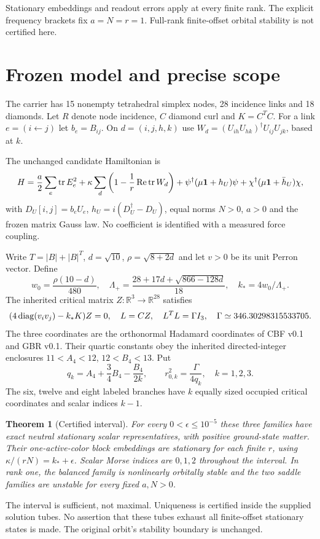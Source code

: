 \documentclass[11pt,a4paper]{article}
\newtheorem{theorem}{Theorem}\newtheorem{lemma}[theorem]{Lemma}
\begin{document}
Stationary embeddings and readout errors apply at every finite rank. The explicit frequency brackets fix $a=N=r=1$. Full-rank finite-offset orbital stability is not certified here.
\newpage
\section{Frozen model and precise scope}
The carrier has 15 nonempty tetrahedral simplex nodes, 28 incidence links and 18 diamonds. Let $R$ denote node incidence, $C$ diamond curl and $K=C^TC$. For a link $e=(i\leftarrow j)$ let $b_e=B_{ij}$. On $d=(i,j,h,k)$ use $W_d=(U_{ih}U_{hk})^\dagger U_{ij}U_{jk}$, based at $k$.

The unchanged candidate Hamiltonian is
\[
H=\frac a2\sum_e\operatorname{tr} E_e^2+\kappa\sum_d\left(1-\frac1r\operatorname{Re}\operatorname{tr} W_d\right)
+\psi^\dagger(\mu\mathbf1+h_U)\psi+\chi^\dagger(\mu\mathbf1+\bar h_U)\chi,
\]
with $D_U[i,j]=b_eU_e$, $h_U=i(D_U^\dagger-D_U)$, equal norms $N>0$, $a>0$ and the frozen matrix Gauss law. No coefficient is identified with a measured force coupling.

Write $T=|B|+|B|^T$, $d=\sqrt{10}$, $\rho=\sqrt{8+2d}$ and let $v>0$ be its unit Perron vector. Define
\[
w_0=\frac{\rho(10-d)}{480},\quad
\Lambda_+=\frac{28+17d+\sqrt{866-128d}}{18},\quad k_* =4w_0/\Lambda_+.
\]
The inherited critical matrix $Z:\mathbb R^3\to\mathbb R^{28}$ satisfies
\[
(4\operatorname{diag}(v_iv_j)-k_*K)Z=0,\quad L=CZ,\quad L^TL=\Gamma I_3,
\quad\Gamma\simeq346.30298315533705.
\]
The three coordinates are the orthonormal Hadamard coordinates of CBF v0.1 and GBR v0.1. Their quartic constants obey the inherited directed-integer enclosures $11<A_4<12$, $12<B_4<13$. Put
\[
q_k=A_4+\frac34B_4-\frac{B_4}{2k},\qquad r_{0,k}^2=\frac\Gamma{4q_k},\quad k=1,2,3.
\]
The six, twelve and eight labeled branches have $k$ equally sized occupied critical coordinates and scalar indices $k-1$.

\begin{theorem}[Certified interval]
For every $0<\epsilon\le10^{-5}$ these three families have exact neutral stationary scalar representatives, with positive ground-state matter. Their one-active-color block embeddings are stationary for each finite $r$, using $\kappa/(rN)=k_*+\epsilon$. Scalar Morse indices are $0,1,2$ throughout the interval. In rank one, the balanced family is nonlinearly orbitally stable and the two saddle families are unstable for every fixed $a,N>0$.
\end{theorem}
The interval is sufficient, not maximal. Uniqueness is certified inside the supplied solution tubes. No assertion that these tubes exhaust all finite-offset stationary states is made. The original orbit's stability boundary is unchanged.
\newpage
\end{document}
